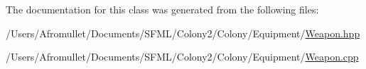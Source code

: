 The documentation for this class was generated from the following files\+:\begin{DoxyCompactItemize}
\item 
/\+Users/\+Afromullet/\+Documents/\+S\+F\+M\+L/\+Colony2/\+Colony/\+Equipment/\mbox{\hyperlink{_weapon_8hpp}{Weapon.\+hpp}}\item 
/\+Users/\+Afromullet/\+Documents/\+S\+F\+M\+L/\+Colony2/\+Colony/\+Equipment/\mbox{\hyperlink{_weapon_8cpp}{Weapon.\+cpp}}\end{DoxyCompactItemize}

